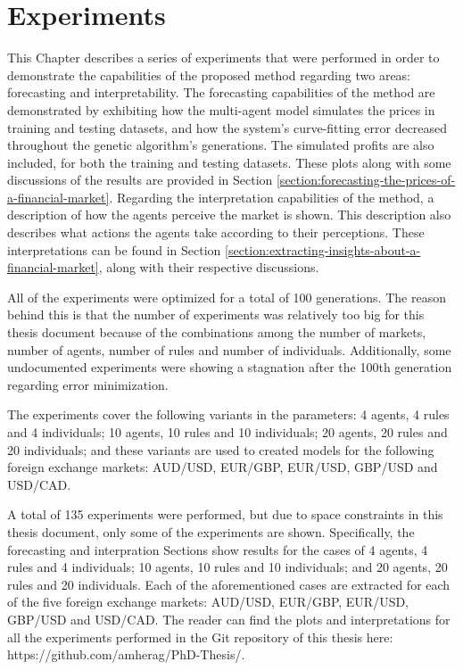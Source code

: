 \chapter{Experiments}
\label{chapter:experiments}


This Chapter describes a series of experiments that were performed in order to
demonstrate the capabilities of the proposed method regarding two areas:
forecasting and interpretability. The forecasting capabilities of the method are
demonstrated by exhibiting how the multi-agent model simulates the prices in
training and testing datasets, and how the system's curve-fitting error
decreased throughout the genetic algorithm's generations. The simulated profits
are also included, for both the training and testing datasets. These plots along
with some discussions of the results are provided in Section
\ref{section:forecasting-the-prices-of-a-financial-market}. Regarding the
interpretation capabilities of the method, a description of how the agents
perceive the market is shown. This description also describes what actions the
agents take according to their perceptions. These interpretations can be found
in Section \ref{section:extracting-insights-about-a-financial-market}, along
with their respective discussions.

All of the experiments were optimized for a total of 100 generations. The reason
behind this is that the number of experiments was relatively too big for this
thesis document because of the combinations among the number of markets, number
of agents, number of rules and number of individuals. Additionally, some
undocumented experiments were showing a stagnation after the 100th generation
regarding error minimization.

The experiments cover the following variants in the parameters: 4 agents, 4
rules and 4 individuals; 10 agents, 10 rules and 10 individuals; 20 agents, 20
rules and 20 individuals; and these variants are used to created models for the
following foreign exchange markets: AUD/USD, EUR/GBP, EUR/USD, GBP/USD and
USD/CAD.

A total of 135 experiments were performed, but due to space constraints in this
thesis document, only some of the experiments are shown. Specifically, the
forecasting and interpration Sections show results for the cases of 4 agents, 4
rules and 4 individuals; 10 agents, 10 rules and 10 individuals; and 20 agents,
20 rules and 20 individuals. Each of the aforementioned cases are extracted for
each of the five foreign exchange markets: AUD/USD, EUR/GBP, EUR/USD, GBP/USD
and USD/CAD. The reader can find the plots and interpretations for all the
experiments performed in the Git repository of this thesis here:
https://github.com/amherag/PhD-Thesis/.

